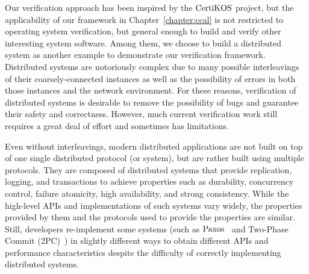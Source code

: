 
Our verification approach has been inspired by the $\mathrm{CertiKOS}$ project,
but the applicability of our framework in Chapter~\ref{chapter:ccal} is not restricted to operating system verification, but general enough
to build and verify other interesting system software. 
Among them, we choose to build a distributed system as another example to demonstrate our 
verification framework.
Distributed systems are notoriously complex due to  many possible interleavings of their coarsely-connected 
instances as well as the possibility of errors in both those instances and the network environment. 
For these reasons, verification of distributed systems is desirable to remove the possibility of bugs and guarantee their safety and correctness. 
However, much current verification work still requires a great deal of effort and sometimes has limitations.


%


Even without interleavings, modern distributed applications are not built on top of one single distributed protocol (or system),
 but are rather built using multiple protocols. They are composed of distributed systems that provide replication, logging, and transactions to achieve properties such as durability, concurrency control, failure atomicity, high availability, and strong consistency. 
 While the high-level APIs and implementations of such systems vary widely, the properties provided by them and the protocols used to provide the properties are similar. Still, developers re-implement some systems (such as $\mathrm{Paxos}$~\cite{paxos} and 
Two-Phase Commit (2PC)~\cite{2PC}) in slightly different ways to obtain different APIs and performance characteristics despite the difficulty of correctly implementing distributed systems.




